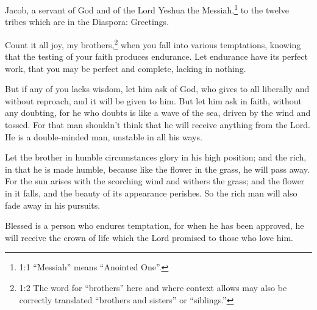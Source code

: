 




\vspace{-1.36in}


\mychapter{} \myverse*{}Jacob, a servant of God and of the Lord Yeshua the Messiah,\footnote{1:1 “Messiah” means “Anointed One”.} to the twelve tribes which are in the Diaspora: Greetings.

\myverse{}Count it all joy, my brothers,\footnote{1:2 The word for “brothers” here and where context allows may also be correctly translated “brothers
	and sisters” or “siblings.”} when you fall into various temptations,
\myverse{}knowing that the testing of your faith produces endurance.
\myverse{}Let endurance have its perfect work, that you may be perfect and complete, lacking
in nothing.

\myverse{}But if any of you lacks wisdom, let him ask of God, who gives to
all liberally and without reproach, and it will be given to him.
\myverse{}But let him ask in faith, without any doubting, for he who doubts is like a
wave of the sea, driven by the wind and tossed.
\myverse{}For that man shouldn’t think that he will receive anything from the Lord.
\myverse{}He is a double-minded man, unstable in all his ways.

\myverse{}Let the brother in humble circumstances glory in his high position;
\myverse{}and the rich, in that he is made humble, because like the flower in the grass,
he will pass away.
\myverse{}For the sun arises with the scorching wind and withers the grass; and the
flower in it falls, and the beauty of its appearance perishes. So the rich man will also fade away in
his pursuits.

\myverse{}Blessed is a person who endures temptation, for when he has been
approved, he will receive the crown of life which the Lord promised to those who love him.

